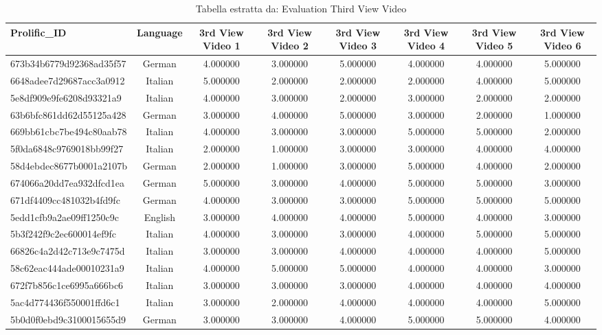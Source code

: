 \begin{table}[htbp]
\caption{Tabella estratta da: Evaluation Third View Video}
\label{tab:evaluation third view video}
\begin{tabular}{lccccccc}
\toprule
Prolific\_ID & Language & 3rd View Video 1 & 3rd View Video 2 & 3rd View Video 3 & 3rd View Video 4 & 3rd View Video 5 & 3rd View Video 6 \\
\midrule
673b34b6779d92368ad35f57 & German & 4.000000 & 3.000000 & 5.000000 & 4.000000 & 4.000000 & 5.000000 \\
6648adee7d29687acc3a0912 & Italian & 5.000000 & 2.000000 & 2.000000 & 2.000000 & 4.000000 & 5.000000 \\
5e8df909e9fe6208d93321a9 & Italian & 4.000000 & 3.000000 & 2.000000 & 3.000000 & 2.000000 & 2.000000 \\
63b6bfc861dd62d55125a428 & German & 3.000000 & 4.000000 & 5.000000 & 3.000000 & 2.000000 & 1.000000 \\
669bb61cbc7be494c80aab78 & Italian & 4.000000 & 3.000000 & 3.000000 & 5.000000 & 5.000000 & 2.000000 \\
5f0da6848c9769018bb99f27 & Italian & 2.000000 & 1.000000 & 3.000000 & 3.000000 & 4.000000 & 4.000000 \\
58d4ebdec8677b0001a2107b & German & 2.000000 & 1.000000 & 3.000000 & 5.000000 & 4.000000 & 2.000000 \\
674066a20dd7ea932dfcd1ea & German & 5.000000 & 3.000000 & 4.000000 & 5.000000 & 5.000000 & 3.000000 \\
671df4409cc481032b4fd9fc & German & 4.000000 & 3.000000 & 3.000000 & 5.000000 & 5.000000 & 5.000000 \\
5edd1cfb9a2ae09ff1250c9c & English & 3.000000 & 4.000000 & 4.000000 & 5.000000 & 4.000000 & 3.000000 \\
5b3f242f9c2ec600014ef9fc & Italian & 4.000000 & 3.000000 & 3.000000 & 4.000000 & 5.000000 & 5.000000 \\
66826c4a2d42c713e9c7475d & Italian & 3.000000 & 3.000000 & 4.000000 & 4.000000 & 4.000000 & 5.000000 \\
58c62eac444ade00010231a9 & Italian & 4.000000 & 5.000000 & 5.000000 & 4.000000 & 4.000000 & 3.000000 \\
672f7b856c1ce6995a666bc6 & Italian & 3.000000 & 3.000000 & 3.000000 & 4.000000 & 4.000000 & 4.000000 \\
5ac4d774436f550001ffd6c1 & Italian & 3.000000 & 2.000000 & 4.000000 & 4.000000 & 4.000000 & 5.000000 \\
5b0d0f0ebd9c3100015655d9 & German & 3.000000 & 3.000000 & 4.000000 & 5.000000 & 5.000000 & 4.000000 \\

\end{tabular}
\end{table}
